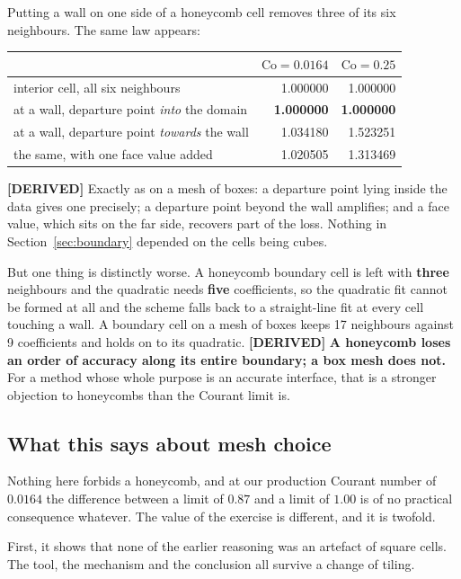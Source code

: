 \documentclass[11pt,a4paper]{article}
\newcommand{\derived}{\textcolor{blue!50!black}{\textbf{[DERIVED]}}}
\begin{document}
Putting a wall on one side of a honeycomb cell removes three of its six neighbours. The same
law appears:

\begin{center}
\begin{tabular}{lrr}
\toprule
 & $\mathrm{Co} = 0.0164$ & $\mathrm{Co} = 0.25$ \\
\midrule
interior cell, all six neighbours                 & 1.000000 & 1.000000 \\
at a wall, departure point \emph{into} the domain & \textbf{1.000000} & \textbf{1.000000} \\
at a wall, departure point \emph{towards} the wall & 1.034180 & 1.523251 \\
\quad the same, with one face value added          & 1.020505 & 1.313469 \\
\bottomrule
\end{tabular}
\end{center}

\derived{} Exactly as on a mesh of boxes: a departure point lying inside the data gives one
precisely; a departure point beyond the wall amplifies; and a face value, which sits on the
far side, recovers part of the loss. Nothing in Section~\ref{sec:boundary} depended on the
cells being cubes.

But one thing is distinctly worse. A honeycomb boundary cell is left with \textbf{three}
neighbours and the quadratic needs \textbf{five} coefficients, so the quadratic fit cannot be
formed at all and the scheme falls back to a straight-line fit at every cell touching a wall.
A boundary cell on a mesh of boxes keeps 17 neighbours against 9 coefficients and holds on to
its quadratic. \derived{} \textbf{A honeycomb loses an order of accuracy along its entire
boundary; a box mesh does not.} For a method whose whole purpose is an accurate interface,
that is a stronger objection to honeycombs than the Courant limit is.

\subsection{What this says about mesh choice}

Nothing here forbids a honeycomb, and at our production Courant number of $0.0164$ the
difference between a limit of $0.87$ and a limit of $1.00$ is of no practical consequence
whatever. The value of the exercise is different, and it is twofold.

First, it shows that none of the earlier reasoning was an artefact of square cells. The tool,
the mechanism and the conclusion all survive a change of tiling.
\end{document}
